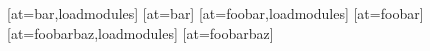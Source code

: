 \documentclass{article}
\begin{document}
\begin{module}[id=foo]
\begin{definition}
[at=bar,loadmodules]
[at=bar]
[at=foobar,loadmodules]
[at=foobar]
[at=foobarbaz,loadmodules]
[at=foobarbaz]
\end{definition}
\end{module}
\end{document}
